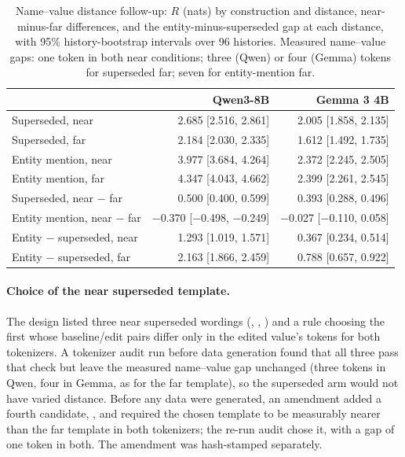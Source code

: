 \begin{table}[t]
\caption{Name--value distance follow-up: $R$ (nats) by construction and distance, near-minus-far differences, and the entity-minus-superseded gap at each distance, with 95\% history-bootstrap intervals over 96 histories. Measured name--value gaps: one token in both near conditions; three (Qwen) or four (Gemma) tokens for superseded far; seven for entity-mention far.}
\label{tab:distance}
\begin{center}
\small
\begin{tabular}{@{}lrr@{}}
\toprule
 & Qwen3-8B & Gemma 3 4B \\
\midrule
Superseded, near & 2.685 [2.516, 2.861] & 2.005 [1.858, 2.135] \\
Superseded, far & 2.184 [2.030, 2.335] & 1.612 [1.492, 1.735] \\
Entity mention, near & 3.977 [3.684, 4.264] & 2.372 [2.245, 2.505] \\
Entity mention, far & 4.347 [4.043, 4.662] & 2.399 [2.261, 2.545] \\
\midrule
Superseded, near $-$ far & 0.500 [0.400, 0.599] & 0.393 [0.288, 0.496] \\
Entity mention, near $-$ far & −0.370 [−0.498, −0.249] & −0.027 [−0.110, 0.058] \\
\midrule
Entity $-$ superseded, near & 1.293 [1.019, 1.571] & 0.367 [0.234, 0.514] \\
Entity $-$ superseded, far & 2.163 [1.866, 2.459] & 0.788 [0.657, 0.922] \\
\bottomrule
\end{tabular}
\end{center}
\end{table}

\paragraph{Choice of the near superseded template.} The design listed three near superseded wordings (, , ) and a rule choosing the first whose baseline/edit pairs differ only in the edited value's tokens for both tokenizers. A tokenizer audit run before data generation found that all three pass that check but leave the measured name--value gap unchanged (three tokens in Qwen, four in Gemma, as for the far template), so the superseded arm would not have varied distance. Before any data were generated, an amendment added a fourth candidate, , and required the chosen template to be measurably nearer than the far template in both tokenizers; the re-run audit chose it, with a gap of one token in both. The amendment was hash-stamped separately.

